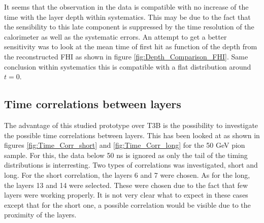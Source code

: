 It seems that the observation in the data is compatible with no increase of the time with the layer depth within systematics. This may be due to the fact that the sensibility to this late component is suppressed by the time resolution of the calorimeter as well as the systematic errors. An attempt to get a better sensitivity was to look at the mean time of first hit as function of the depth from the reconstructed FHI as shown in figure \ref{fig:Depth_Comparison_FHI}. Same conclusion within systematics this is compatible with a flat distribution around $t=0$.

\subsection{Time correlations between layers}

The advantage of this studied prototype over T3B is the possibility to investigate the possible time correlations between layers. This has been looked at as shown in figures \ref{fig:Time_Corr_short} and \ref{fig:Time_Corr_long} for the 50 GeV pion sample. For this, the data below 50 ns is ignored as only the tail of the timing distributions is interresting. Two types of correlations was investigated, short and long. For the short correlation, the layers 6 and 7 were chosen. As for the long, the layers 13 and 14 were selected. These were chosen due to the fact that few layers were working properly. It is not very clear what to expect in these cases except that for the short one, a possible correlation would be visible due to the proximity of the layers.

